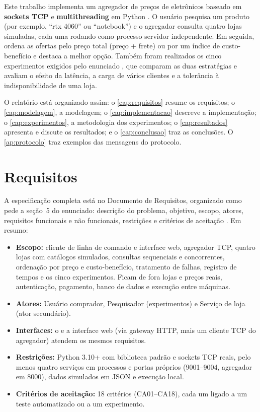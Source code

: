 Este trabalho implementa um agregador de preços de eletrônicos baseado em \textbf{sockets TCP} e \textbf{multithreading} em Python \cite{python-socket,python-threading}. O usuário pesquisa um produto (por exemplo, ``rtx 4060'' ou ``notebook'') e o agregador consulta quatro lojas simuladas, cada uma rodando como processo servidor independente. Em seguida, ordena as ofertas pelo preço total (preço + frete) ou por um índice de custo-benefício e destaca a melhor opção. Também foram realizados os cinco experimentos exigidos pelo enunciado \cite{enunciado2026}, que comparam as duas estratégias e avaliam o efeito da latência, a carga de vários clientes e a tolerância à indisponibilidade de uma loja.

O relatório está organizado assim: o \autoref{cap:requisitos} resume os requisitos; o \autoref{cap:modelagem}, a modelagem; o \autoref{cap:implementacao} descreve a implementação; o \autoref{cap:experimentos}, a metodologia dos experimentos; o \autoref{cap:resultados} apresenta e discute os resultados; e o \autoref{cap:conclusao} traz as conclusões. O \autoref{ap:protocolo} traz exemplos das mensagens do protocolo.

\chapter{Requisitos}\label{cap:requisitos}

A especificação completa está no Documento de Requisitos, organizado como pede a seção~5 do enunciado: descrição do problema, objetivo, escopo, atores, requisitos funcionais e não funcionais, restrições e critérios de aceitação \cite{sommerville2015}. Em resumo:

\begin{itemize}
  \item \textbf{Escopo:} cliente de linha de comando e interface web, agregador TCP, quatro lojas com catálogos simulados, consultas sequenciais e concorrentes, ordenação por preço e custo-benefício, tratamento de falhas, registro de tempos e os cinco experimentos. Ficam de fora lojas e preços reais, autenticação, pagamento, banco de dados e execução entre máquinas.
  \item \textbf{Atores:} Usuário comprador, Pesquisador (experimentos) e Serviço de loja (ator secundário).
  \item \textbf{Interfaces:} o  e a interface web (via gateway HTTP, mais um cliente TCP do agregador) atendem os mesmos requisitos.
  \item \textbf{Restrições:} Python 3.10+ com biblioteca padrão e sockets TCP reais, pelo menos quatro serviços em processos e portas próprios (9001--9004, agregador em 8000), dados simulados em JSON e execução local.
  \item \textbf{Critérios de aceitação:} 18 critérios (CA01--CA18), cada um ligado a um teste automatizado ou a um experimento.
\end{itemize}

